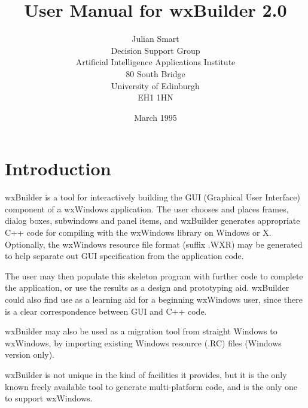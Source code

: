 %
\parindent 0pt
\parskip 11pt

\title{User Manual for wxBuilder 2.0}
\author{Julian Smart\\Decision Support Group\\Artificial Intelligence Applications Institute\\80 South Bridge\\University of Edinburgh\\EH1 1HN}
\date{March 1995}
\makeindex

\maketitle

\pagestyle{fancyplain}

\setfooter{\thepage}{}{}{}{}{\thepage}
\tableofcontents%

\begin{comment}
To be done:
-- describe what effect Description, name etc. have on generated code.
\end{comment}
\chapter{Introduction}%
%
%
\setfooter{\thepage}{}{}{}{}{\thepage}%

wxBuilder is a tool for interactively building the GUI (Graphical User
Interface) component of a wxWindows application. The user chooses and
places frames, dialog boxes, subwindows and panel items, and wxBuilder
generates appropriate C++ code for compiling with the wxWindows library
on Windows or X. Optionally, the wxWindows resource file format (suffix .WXR)
may be generated to help separate out GUI specification from the application
code.

The user may then populate this skeleton program with further code to
complete the application, or use the results as a design and prototyping
aid. wxBuilder could also find use as a learning aid for a beginning
wxWindows user, since there is a clear correspondence between GUI and
C++ code.

wxBuilder may also be used as a migration tool from straight Windows to
wxWindows, by importing existing Windows resource (.RC) files (Windows version
only).

wxBuilder is not unique in the kind of facilities it provides, but it is
the only known freely available tool to generate multi-platform code,
and is the only one to support wxWindows.

